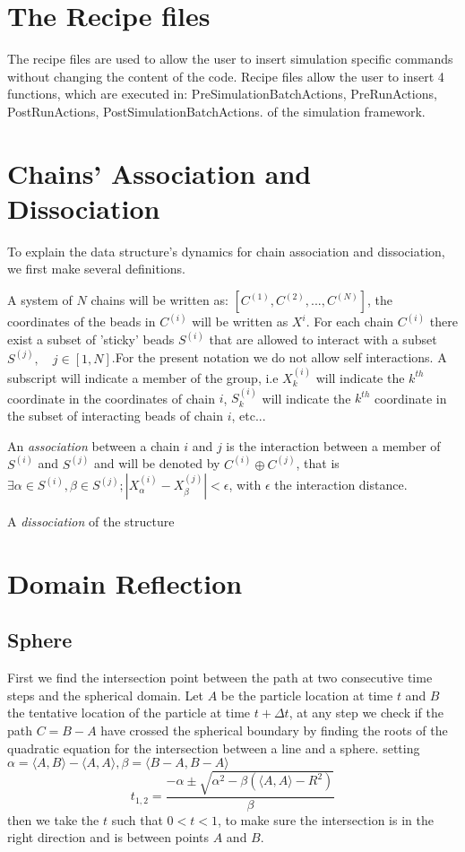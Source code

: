 \documentclass[12pt]{report}
\begin{document}
\section{The Recipe files}
The recipe files are used to allow the user to insert simulation specific commands without changing the content of the code. Recipe files allow the user to insert 4 functions, which are executed in: PreSimulationBatchActions, PreRunActions, PostRunActions, PostSimulationBatchActions. of the simulation framework. 

\section{Chains' Association and Dissociation} 
To explain the data structure's dynamics for chain association and dissociation, we first make several definitions.

A system of $N$ chains will be written as:  $[C^{(1)},C^{(2)},...,C^{(N)} ]$, the coordinates of the beads in $C^{(i)}$ will be written as $X^{i}$. For each chain $C^{(i)}$ there exist a subset of 'sticky' beads $S^{(i)}$ that are allowed to interact with a subset $S^{(j)},\quad j\in [1,N]$.For the present notation we do not allow self interactions. A subscript will indicate a member of the group, i.e $X^{(i)}_k$ will indicate the $k^{th}$ coordinate in the coordinates of chain $i$, $S^{(i)}_k$ will indicate the $k^{th}$ coordinate in the subset of interacting beads of chain $i$, etc... 

An \textit{association} between a chain $i$ and $j$ is the interaction between a member of $S^{(i)}$ and $S^{(j)}$ and will be denoted by  
$C^{(i)}\oplus C^{(j)}$, that is $\exists \alpha \in S^{(i)},\beta \in S^{(j)}; |X^{(i)}_\alpha-X^{(j)}_\beta |<\epsilon$, with $\epsilon$ the interaction distance.

A \textit{dissociation} of the structure 
 

\section{Domain Reflection}
\subsection{Sphere}
First we find the intersection point between the path at two consecutive time steps and the spherical domain. Let $A$ be the particle location at time $t$ and $B$ the tentative location of the particle at time $t+\Delta t$, at any step we check if the path $C=B-A$ have crossed the spherical boundary by finding the roots of the quadratic equation for the intersection between a line and a sphere. setting $\alpha= \langle A,B \rangle -\langle A,A \rangle , \beta = \langle B-A,B-A \rangle$
\begin{equation*}
t_{1,2}=\frac{-\alpha \pm \sqrt{\alpha^2-\beta (\langle A,A \rangle -R^2)}}{\beta}
\end{equation*}
then we take the $t$ such that $0<t<1$, to make sure the intersection is in the right direction and is between points $A$ and $B$.
\end{document}
